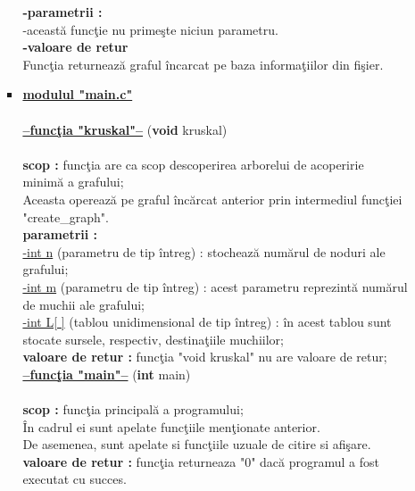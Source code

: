 \documentclass[14pt]{article}
\begin{document}
\begin{itemize}
\begin{itemize}
\begin{itemize}
         \textbf{-parametrii :}\\
         -aceast\u{a} func\c tie nu prime\c ste niciun parametru.\\
         \textbf{-valoare de retur}\\
         Func\c tia returneaz\u{a} graful \^incarcat pe baza informa\c tiilor din fi\c sier.
         \\
          \item \underline{\textbf{modulul "main.c"}}\\
          \\
          \underline{\textbf{--func\c tia "kruskal"--}} (\textbf{void} kruskal)\\
          \\
          \textbf{scop :} func\c tia are ca scop descoperirea arborelui de acoperirie minim\u{a} a grafului;\\
          Aceasta opereaz\u{a} pe graful \^inc\u{a}rcat anterior prin intermediul func\c tiei "create\_graph".\\
          \textbf{parametrii :}\\
          \underline{-int n} (parametru de tip \^intreg) : stocheaz\u{a} num\u{a}rul de noduri ale grafului;\\
          \underline{-int m} (parametru de tip \^intreg) : acest parametru reprezint\u{a} num\u{a}rul de muchii ale grafului;\\
          \underline{-int L[ ]} (tablou unidimensional de tip \^intreg) : \^in acest tablou sunt stocate sursele, respectiv, destina\c tiile muchiilor;\\
          \textbf{valoare de retur :} func\c tia "void kruskal" nu are valoare de retur;\\
          
           \underline{\textbf{--func\c tia "main"--}} (\textbf{int} main)\\
           \\
          \textbf{scop :} func\c tia principal\u{a} a programului;\\
          \^In cadrul ei sunt apelate func\c tiile men\c tionate anterior.\\
          De asemenea, sunt apelate si func\c tiile uzuale de citire si afi\c sare.\\
        \textbf{valoare de retur :} func\c tia returneaza "0" dac\u{a} programul a fost executat cu succes.
    \end{itemize}
    
    \end{itemize}
    
\end{itemize}
\end{document}
